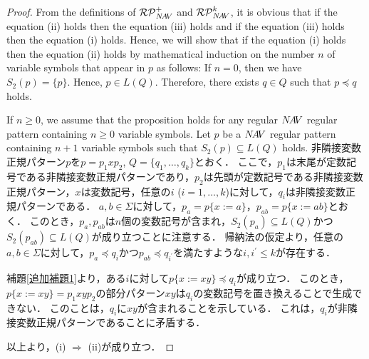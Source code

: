 \begin{proof}
From the definitions of $\mathcal{RP}^{+}_{N\!A\!V}$ and $\mathcal{RP}^{k}_{N\!A\!V}$, it is obvious that if the equation (ii) holds then the equation (iii) holds and if the equation (iii) holds then the equation (i) holds.
Hence, we will show that if the equation (i) holds then the equation (ii) holds
by mathematical induction on the number $n$ of variable symbols that appear in $p$ as follows:
%
If $n=0$, then we have $S_{2}(p)= \{ p \}$.
Hence, $p \in L(Q)$.
Therefore, there exists $q \in Q$ such that $p \preceq q$ holds.

If $n \ge 0$, we assume that the proposition holds for any regular $N\!A\!V$ regular pattern containing $n \ge 0$ variable symbols.
Let $p$ be a $N\!A\!V$ regular pattern containing $n+1$ variable symbols such that $S_{2}(p) \subseteq L(Q)$ holds.
非隣接変数正規パターン$p$を$p=p_{1}xp_{2}$, $Q=\{ q_{1}, \ldots , q_{k} \}$とおく．
ここで，$p_{1}$は末尾が定数記号である非隣接変数正規パターンであり，$p_{2}$は先頭が定数記号である非隣接変数正規パターン，$x$は変数記号，任意の$i$ ($i=1, \ldots, k$)に対して，$q_{i}$は非隣接変数正規パターンである．
$a, b \in \Sigma$に対して，$p_{a}=p \{ x := a \}$，$p_{ab}=p \{ x := ab \}$とおく．
このとき，$p_{a}, p_{ab}$は$n$個の変数記号が含まれ，$S_{2}(p_{a}) \subseteq L(Q)$かつ$S_{2}(p_{ab}) \subseteq L(Q)$が成り立つことに注意する．
帰納法の仮定より，任意の$a, b \in \Sigma$に対して，$p_{a} \preceq q_{i}$かつ$p_{ab} \preceq q_{i^{\prime}}$を満たすような$i, i^{\prime} \le k$が存在する．

補題\ref{追加補題1}より，ある$i$に対して$p \{ x:=xy \} \preceq q_{i}$が成り立つ．
このとき，$p \{ x:=xy \} =p_{1}xyp_{2}$の部分パターン$xy$は$q_{i}$の変数記号を置き換えることで生成できない．
このことは，$q_{i}$に$xy$が含まれることを示している．
これは，$q_{i}$が非隣接変数正規パターンであることに矛盾する．

以上より，(i) $\Rightarrow$ (ii)が成り立つ．
\end{proof}

